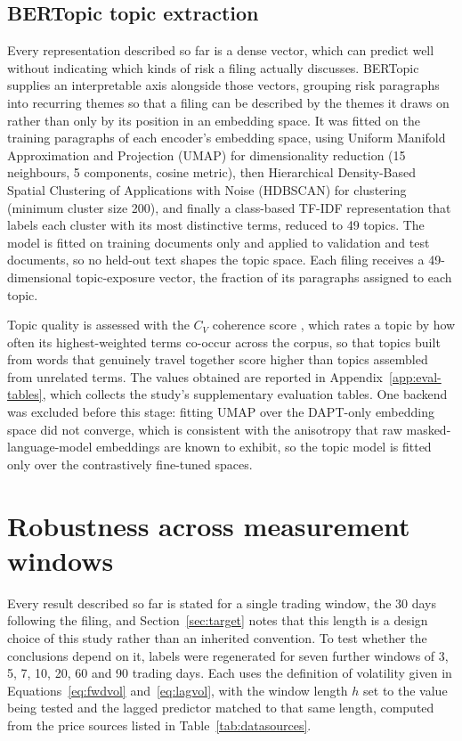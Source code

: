 \documentclass[logo,msc,ai]{infthesis}        %
\begin{document}
\subsection{BERTopic topic extraction}
Every representation described so far is a dense vector, which can predict well without indicating which kinds of risk a filing actually discusses. BERTopic \cite{grootendorst2022bertopic} supplies an interpretable axis alongside those vectors, grouping risk paragraphs into recurring themes so that a filing can be described by the themes it draws on rather than only by its position in an embedding space. It was fitted on the training paragraphs of each encoder's embedding space, using Uniform Manifold Approximation and Projection (UMAP) \cite{McInnes2018} for dimensionality reduction (15 neighbours, 5 components, cosine metric), then Hierarchical Density-Based Spatial Clustering of Applications with Noise (HDBSCAN) \cite{campello2013density} for clustering (minimum cluster size 200), and finally a class-based TF-IDF representation that labels each cluster with its most distinctive terms, reduced to 49 topics. The model is fitted on training documents only and applied to validation and test documents, so no held-out text shapes the topic space. Each filing receives a 49-dimensional topic-exposure vector, the fraction of its paragraphs assigned to each topic.

Topic quality is assessed with the $C_V$ coherence score \cite{roder2015exploring}, which rates a topic by how often its highest-weighted terms co-occur across the corpus, so that topics built from words that genuinely travel together score higher than topics assembled from unrelated terms. The values obtained are reported in Appendix~\ref{app:eval-tables}, which collects the study's supplementary evaluation tables. One backend was excluded before this stage: fitting UMAP over the DAPT-only embedding space did not converge, which is consistent with the anisotropy that raw masked-language-model embeddings are known to exhibit, so the topic model is fitted only over the contrastively fine-tuned spaces.

\section{Robustness across measurement windows}
\label{sec:horizon}
Every result described so far is stated for a single trading window, the 30 days following the filing, and Section~\ref{sec:target} notes that this length is a design choice of this study rather than an inherited convention. To test whether the conclusions depend on it, labels were regenerated for seven further windows of 3, 5, 7, 10, 20, 60 and 90 trading days. Each uses the definition of volatility given in Equations~\ref{eq:fwdvol} and~\ref{eq:lagvol}, with the window length $h$ set to the value being tested and the lagged predictor matched to that same length, computed from the price sources listed in Table~\ref{tab:datasources}.
\end{document}
